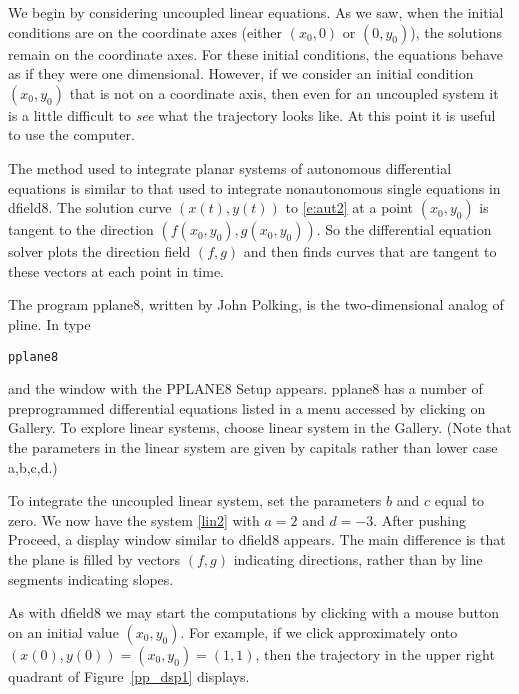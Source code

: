 \documentclass{ximera}
\begin{document}
We begin by considering uncoupled linear equations.  As we saw,
when the initial conditions are on the coordinate axes (either
$(x_0,0)$ or $(0,y_0)$), the solutions remain on the coordinate
axes.  For these initial conditions, the equations behave as if
they were one dimensional.  However, if we consider an initial
condition $(x_0,y_0)$ that is not on a coordinate axis, then even
for an uncoupled system it is a little difficult to
{\em see\/} what the trajectory looks like.  At this point
it is useful to use the computer.

The method used to integrate planar systems of autonomous
differential equations is similar to that used to integrate
nonautonomous single equations in {\sf dfield8}.  The solution
curve $(x(t),y(t))$ to \eqref{e:aut2} at a point $(x_0,y_0)$ is
tangent to the direction $(f(x_0,y_0),g(x_0,y_0))$.  So
the differential equation solver plots the direction field
$(f,g)$ and then finds curves that are tangent to these
vectors at each point in time.

The program {\sf pplane8}, written by John
Polking, is the two-dimensional analog of {\sf pline}.  
In \Matlab type
\begin{verbatim}
pplane8
\end{verbatim}
and the window with the {\sf PPLANE8 Setup} appears. {\sf pplane8}
has a number of preprogrammed differential equations listed in a
menu accessed by clicking on {\sf Gallery}.  To explore linear
systems, choose {\sf linear system} in the {\sf Gallery}.  (Note that the 
parameters in the {\sf linear system} are given by capitals rather than 
lower case {\sf a,b,c,d}.)

To integrate the uncoupled linear system, set the parameters $b$
and $c$ equal to zero. We now have the system \eqref{lin2} with
$a = 2$ and $d = -3$.  After pushing {\sf Proceed}, a display window
similar to {\sf dfield8} appears.  The main difference is that
the plane is filled by vectors $(f,g)$ indicating directions,
rather than by line segments indicating slopes.

As with {\sf dfield8} we may start the computations by clicking
with a mouse button on an initial value $(x_0,y_0)$.  For example,
if we click approximately onto $(x(0),y(0))=(x_0,y_0)=(1,1)$, then
the trajectory in the upper right quadrant of
Figure~\ref{pp_dsp1} displays.

\begin{figure*}[htb]
     \centerline{%
     }
     \caption{{\sf PPLANE8 Display} for \protect\eqref{lin2} with
             $a=2$, $d=-3$ and $x,y\in [-5,5]$. Solutions
             going through $(\pm 1,\pm 1)$ are shown.}
     \label{pp_dsp1}
\end{figure*}
\end{document}
